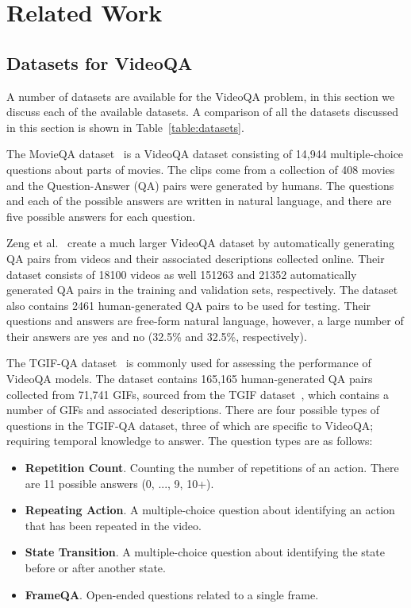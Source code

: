 \documentclass[../interim.tex]{subfiles}
\begin{document}
\chapter{Related Work} \label{chapter:related}

\section{Datasets for VideoQA}

A number of datasets are available for the VideoQA problem, in this section we discuss each of the available datasets. A comparison of all the datasets discussed in this section is shown in Table~\ref{table:datasets}.

The MovieQA dataset~\cite{dataset:movie-qa} is a VideoQA dataset consisting of 14,944 multiple-choice questions about parts of movies. The clips come from a collection of 408 movies and the Question-Answer (QA) pairs were generated by humans. The questions and each of the possible answers are written in natural language, and there are five possible answers for each question.

Zeng et al.~\cite{dataset:zeng} create a much larger VideoQA dataset by automatically generating QA pairs from videos and their associated descriptions collected online. Their dataset consists of 18100 videos as well 151263 and 21352 automatically generated QA pairs in the training and validation sets, respectively. The dataset also contains 2461 human-generated QA pairs to be used for testing. Their questions and answers are free-form natural language, however, a large number of their answers are yes and no (32.5\% and 32.5\%, respectively).

The TGIF-QA dataset~\cite{dataset:tgif-qa} is commonly used for assessing the performance of VideoQA models. The dataset contains 165,165 human-generated QA pairs collected from 71,741 GIFs, sourced from the TGIF dataset~\cite{dataset:tgif}, which contains a number of GIFs and associated descriptions. There are four possible types of questions in the TGIF-QA dataset, three of which are specific to VideoQA; requiring temporal knowledge to answer. The question types are as follows:
\begin{itemize}
  \item \textbf{Repetition Count}. Counting the number of repetitions of an action. There are 11 possible answers (0, ..., 9, 10+).

  \item \textbf{Repeating Action}. A multiple-choice question about identifying an action that has been repeated in the video.

  \item \textbf{State Transition}. A multiple-choice question about identifying the state before or after another state.

  \item \textbf{FrameQA}. Open-ended questions related to a single frame.
\end{itemize}
\end{document}
